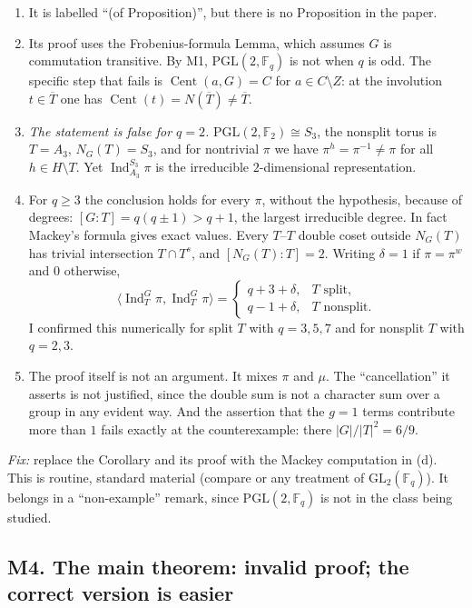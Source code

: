 \documentclass[12pt,letterpaper]{article}
\newcommand{\F}{\mathbb{F}}
\newcommand{\Cent}{\operatorname{Cent}}
\newcommand{\Ind}{\operatorname{Ind}}
\newcommand{\PGL}{\mathrm{PGL}}
\newcommand{\GL}{\mathrm{GL}}
\theoremstyle{definition}
\begin{document}
\begin{enumerate}[label=(\alph*),itemsep=1pt]
\item It is labelled ``(of Proposition)'', but there is no Proposition
  in the paper.
\item Its proof uses the Frobenius-formula Lemma, which assumes $G$ is
  commutation transitive. By M1, $\PGL(2,\F_q)$ is not when $q$ is odd.
  The specific step that fails is $\Cent(a,G)=C$ for $a\in C\setminus
  Z$: at the involution $t\in\overline T$ one has
  $\Cent(t)=N(\overline T)\ne\overline T$.
\item \emph{The statement is false for $q=2$.} $\PGL(2,\F_2)\cong S_3$,
  the nonsplit torus is $T=A_3$, $N_G(T)=S_3$, and for nontrivial $\pi$
  we have $\pi^h=\pi^{-1}\neq\pi$ for all $h\in H\setminus T$. Yet
  $\Ind_{A_3}^{S_3}\pi$ is the irreducible $2$-dimensional
  representation.
\item For $q\ge3$ the conclusion holds for every $\pi$, without the
  hypothesis, because of degrees: $[G:T]=q(q\pm1)>q+1$, the largest
  irreducible degree. In fact Mackey's formula gives exact values. Every
  $T$--$T$ double coset outside $N_G(T)$ has trivial intersection
  $T\cap T^s$, and $[N_G(T):T]=2$. Writing $\delta=1$ if $\pi=\pi^w$
  and $0$ otherwise,
  \[
  \langle\Ind_T^G\pi,\Ind_T^G\pi\rangle=
  \begin{cases}
  q+3+\delta, & T\text{ split},\\
  q-1+\delta, & T\text{ nonsplit}.
  \end{cases}
  \]
  I confirmed this numerically for split $T$ with $q=3,5,7$ and for
  nonsplit $T$ with $q=2,3$.
\item The proof itself is not an argument. It mixes $\pi$ and $\mu$.
  The ``cancellation'' it asserts is not justified, since the double sum
  is not a character sum over a group in any evident way. And the
  assertion that the $g=1$ terms contribute more than $1$ fails exactly
  at the counterexample: there $|G|/|T|^2=6/9$.
\end{enumerate}
\emph{Fix:} replace the Corollary and its proof with the Mackey
computation in (d). This is routine, standard material (compare
\cite{B} or any treatment of $\GL_2(\F_q)$). It belongs in a
``non-example'' remark, since $\PGL(2,\F_q)$ is not in the class being
studied.

\subsection*{M4. The main theorem: invalid proof; the correct version is easier}
\end{document}
